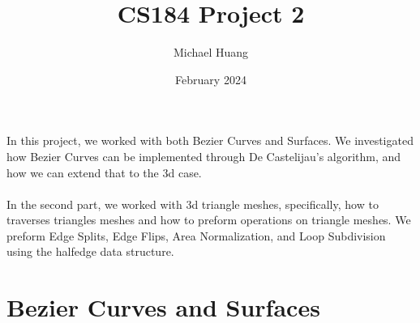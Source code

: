 \documentclass{article}
\title{CS184 Project 2}
\author{Michael Huang}
\date{February 2024}
\begin{document}
\maketitle
In this project, we worked with both Bezier Curves and Surfaces. We investigated how Bezier Curves can be implemented through De Castelijau's algorithm, and how we can extend that to the 3d case. 
\\
\\
In the second part, we worked with 3d triangle meshes, specifically, how to traverses triangles meshes and how to preform operations on triangle meshes. We preform Edge Splits, Edge Flips, Area Normalization, and Loop Subdivision using the halfedge data structure.
\section{Bezier Curves and Surfaces}
\end{document}
